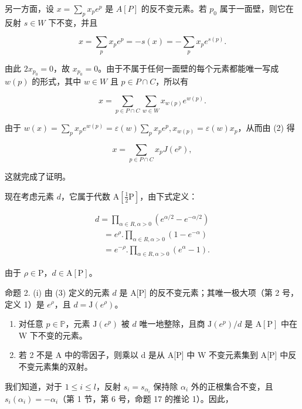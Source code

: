 另一方面，设 \(x = \sum_{p} x_{p} e^{p}\) 是 \(A[P]\) 的反不变元素。若 \(p_{0}\) 属于一面壁，则它在反射 \(s \in W\) 下不变，并且

\[
x = \sum_ {p} x _ {p} e ^ {p} = - s (x) = - \sum_ {p} x _ {p} e ^ {s (p)}.
\]

由此 \(2x_{p_{0}} = 0\)，故 \(x_{p_{0}} = 0\)。由于不属于任何一面壁的每个元素都能唯一写成 \(w(p)\) 的形式，其中 \(w \in W\) 且 \(p \in P \cap C\)，所以有

\[
x = \sum_ {p \in P \cap C} \sum_ {w \in W} x _ {w (p)} e ^ {w (p)}.\tag{2}
\]

由于 \(w(x) = \sum_{p} x_{p} e^{w(p)} = \varepsilon(w) \sum_{p} x_{p} e^{p}, x_{w(p)} = \varepsilon(w) x_{p}\)，从而由 (2) 得

\[
x = \sum_ {p \in P \cap C} x _ {p} J (e ^ {p}),
\]

这就完成了证明。

现在考虑元素 \(d\)，它属于代数 \(\mathrm{A}[\frac{1}{2}\mathrm{P}]\)，由下式定义：

\[
\begin{array}{l} d = \prod_ {\alpha \in R, \alpha > 0} (e ^ {\alpha / 2} - e ^ {- \alpha / 2}) \\ \quad = e ^ {\rho}. \prod_ {\alpha \in R, \alpha > 0} (1 - e ^ {- \alpha}) \\ \quad = e ^ {- \rho}. \prod_ {\alpha \in R, \alpha > 0} (e ^ {\alpha} - 1). \end{array}\tag{3}
\]

由于 \(\rho \in \mathrm{P}\)，\(d \in \mathrm{A}[\mathrm{P}]\)。

命题 2. (i) 由 (3) 定义的元素 \(d\) 是 A{[}P{]} 的反不变元素；其唯一极大项（第 2 号，定义 1）是 \(e^{\rho}\)，且 \(d = \mathrm{J}(e^{\rho})\)。

\begin{enumerate}
\def\labelenumi{(\roman{enumi})}
\setcounter{enumi}{1}
\item
  对任意 \(p \in \mathbb{P}\)，元素 \(\mathrm{J}(e^p)\) 被 \(d\) 唯一地整除，且商 \(\mathrm{J}(e^p)/d\) 是 \(\mathrm{A}[\mathrm{P}]\) 中在 \(\mathrm{W}\) 下不变的元素。
\item
  若 2 不是 A 中的零因子，则乘以 d 是从 A{[}P{]} 中 W 不变元素集到 A{[}P{]} 中反不变元素集的双射。
\end{enumerate}

我们知道，对于 \(1 \leqslant i \leqslant l\)，反射 \(s_i = s_{\alpha_i}\) 保持除 \(\alpha_i\) 外的正根集合不变，且 \(s_i(\alpha_i) = -\alpha_i\)（第 1 节，第 6 号，命题 17 的推论 1）。因此，

